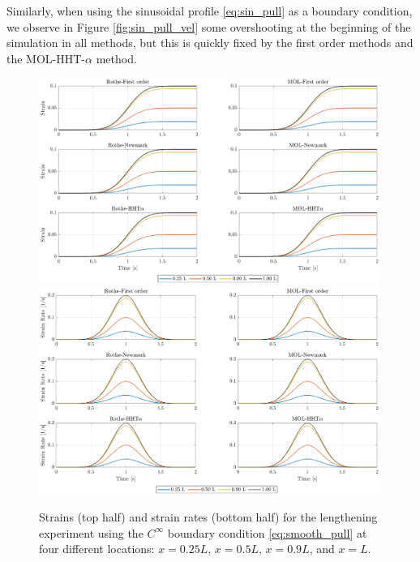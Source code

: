 \documentclass{sfuthesis}
\numberwithin{equation}{section}
\numberwithin{figure}{chapter}
\numberwithin{table}{chapter}
\theoremstyle{definition}
\begin{document}
Similarly, when using the sinusoidal profile \eqref{eq:sin_pull} as a boundary condition, we observe in Figure \ref{fig:sin_pull_vel} some overshooting at the beginning of the simulation in all methods, but this is quickly fixed by the first order methods and the MOL-HHT-$\alpha$ method. 

\begin{figure}
    \centering
    \includegraphics[width=0.99\textwidth]{nh_smooth_disp.eps}
    \includegraphics[width=0.99\textwidth]{nh_smooth_vel.eps}
    \caption{Strains (top half) and strain rates (bottom half) for the lengthening experiment using the $C^\infty$ boundary condition \eqref{eq:smooth_pull} at four different locations: $x = 0.25L$, $x=0.5L$, $x=0.9L$, and $x=L$.
    \label{fig:smooth_pull}}
\end{figure}
\end{document}
